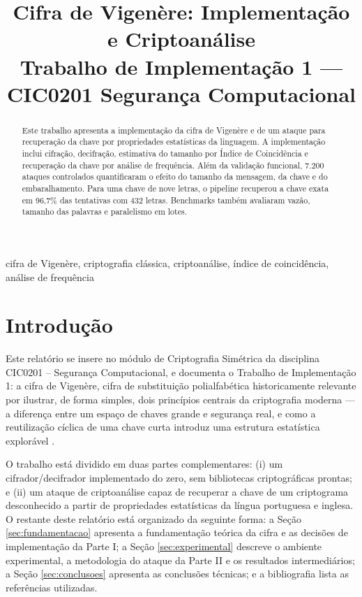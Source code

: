 \documentclass[conference]{IEEEtran}
\begin{document}
\title{Cifra de Vigenère: Implementação e Criptoanálise\\
\large Trabalho de Implementação 1 --- CIC0201 Segurança Computacional}

\author{
\and
{}
\and
{}
\and
{}
}

\maketitle

\begin{abstract}
Este trabalho apresenta a implementação da cifra de Vigenère e de um
ataque para recuperação da chave por propriedades estatísticas da
linguagem. A implementação inclui cifração, decifração, estimativa do
tamanho por Índice de Coincidência e recuperação da chave por análise
de frequência. Além da validação funcional, 7.200 ataques controlados
quantificaram o efeito do tamanho da mensagem, da chave e do
embaralhamento. Para uma chave de nove letras, o pipeline recuperou a
chave exata em 96,7\% das tentativas com 432 letras. Benchmarks também
avaliaram vazão, tamanho das palavras e paralelismo em lotes.
\end{abstract}

\begin{IEEEkeywords}
cifra de Vigenère, criptografia clássica, criptoanálise, índice de coincidência, análise de frequência
\end{IEEEkeywords}

\section{Introdução}

Este relatório se insere no módulo de Criptografia Simétrica da
disciplina CIC0201 -- Segurança Computacional, e documenta o Trabalho
de Implementação 1: a cifra de Vigenère, cifra de substituição
polialfabética historicamente relevante por ilustrar, de forma
simples, dois princípios centrais da criptografia moderna --- a
diferença entre um espaço de chaves grande e segurança real, e como a
reutilização cíclica de uma chave curta introduz uma estrutura
estatística explorável \cite{roteiro}.

O trabalho está dividido em duas partes complementares: (i) um
cifrador/decifrador implementado do zero, sem bibliotecas
criptográficas prontas; e (ii) um ataque de criptoanálise capaz de
recuperar a chave de um criptograma desconhecido a partir de
propriedades estatísticas da língua portuguesa e inglesa. O restante
deste relatório está organizado da seguinte forma: a Seção
\ref{sec:fundamentacao} apresenta a fundamentação teórica da cifra e
as decisões de implementação da Parte I; a Seção
\ref{sec:experimental} descreve o ambiente experimental, a
metodologia do ataque da Parte II e os resultados intermediários; a
Seção \ref{sec:conclusoes} apresenta as
conclusões técnicas; e a bibliografia lista as referências
utilizadas.
\end{document}
